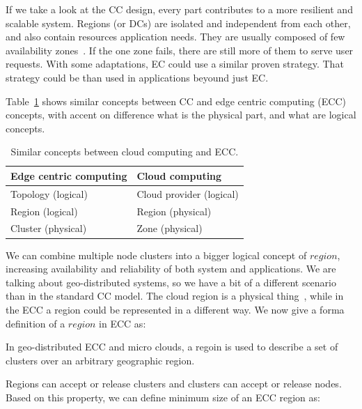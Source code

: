 If we take a look at the CC design, every part contributes to a more resilient and scalable system. Regions (or DCs) are isolated and independent from each other, and also contain resources application needs. They are usually composed of few availability zones~\cite{SouzaMFAK19}. If the one zone fails, there are still more of them to serve user requests. With some adaptations, EC could use a similar proven strategy. That strategy could be than used in applications beyound just EC.

Table~\ref{tab:table5} shows similar concepts between CC and edge centric computing (ECC) concepts, with accent on difference what is the physical part, and what are logical concepts.

\begin{table}[h!]
	\begin{center}
		\begin{tabular}{l|l}
			\textbf{Edge centric computing} & \textbf{Cloud computing}\\
			\hline
			Topology (logical) & Cloud provider (logical)\\
			Region (logical) & Region (physical)\\
			Cluster (physical) & Zone (physical)\\
		\end{tabular}
	\end{center}
	\vspace{-0.5cm}
	\caption{Similar concepts between cloud computing and ECC.}
	\label{tab:table5}
\end{table}

We can combine multiple node clusters into a bigger logical concept of $region$, increasing availability and reliability of both system and applications. We are talking about geo-distributed systems, so we have a bit of a different scenario than in the standard CC model. The cloud region is a physical thing~\cite{SouzaMFAK19}, while in the ECC a region could be represented in a different way. We now give a forma definition of a $region$ in ECC as:

\begin{definition}
	In geo-distributed ECC and micro clouds, a regoin is used to describe a set of clusters over an arbitrary geographic region. 
\end{definition}

Regions can accept or release clusters and clusters can accept or release nodes. Based on this property, we can define minimum size of an ECC region as:

